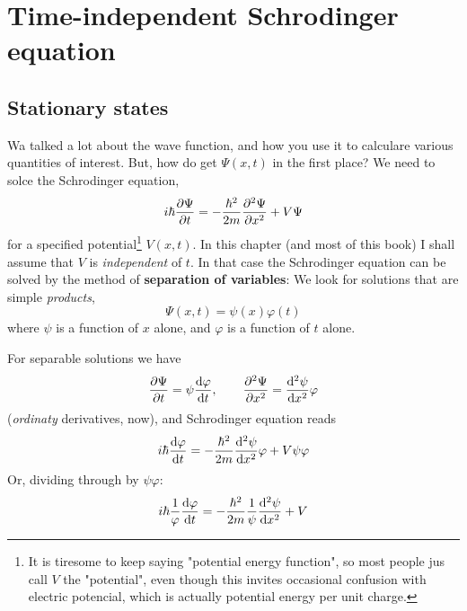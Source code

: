 \chapter{Time-independent Schrodinger equation}
\section{Stationary states}
Wa talked a lot about the wave function, and how you use it to calculare various quantities of interest. But, how do get $\Psi(x,t)$ in the first place? We need to solce the Schrodinger equation,
\begin{equation}\label{2.1}
	i\hbar\pdv{\Psi}{t}=-\frac{\hbar^2}{2m}\pdv[2]{\Psi}{x}+V\Psi
\end{equation}
for a specified potential\footnote{It is tiresome to keep saying "potential energy function", so most people jus call $V$ the "potential", even though this invites occasional confusion with electric potencial, which is actually potential energy per unit charge.} $V(x,t)$. In this chapter (and most of this book) I shall assume that $V$ is \textit{independent} of $t$. In that case the Schrodinger equation can be solved by the method of \textbf{separation of variables}: We look for solutions that are simple \textit{products},
\begin{equation}\label{2.2}
	\Psi(x,t)=\psi(x)\varphi(t)
\end{equation}
where $\psi$ is a function of $x$ alone, and $\varphi$ is a function of $t$ alone. 

For separable solutions we have
\begin{equation*}
	\pdv{\Psi}{t}=\psi\dv{\varphi}{t},\qquad \pdv[2]{\Psi}{x}=\dv[2]{\psi}{x}\varphi
\end{equation*}
(\textit{ordinaty} derivatives, now), and Schrodinger equation reads
\begin{equation}
	i\hbar\dv{\varphi}{t}=-\frac{\hbar^2}{2m}\dv[2]{\psi}{x}\varphi + V\psi\varphi
\end{equation}
Or, dividing through by $\psi\varphi$:
\begin{equation}\label{2.3}
	i\hbar\frac{1}{\varphi}\dv{\varphi}{t}=-\frac{\hbar^2}{2m}\frac{1}{\psi}\dv[2]{\psi}{x}+V
\end{equation}

